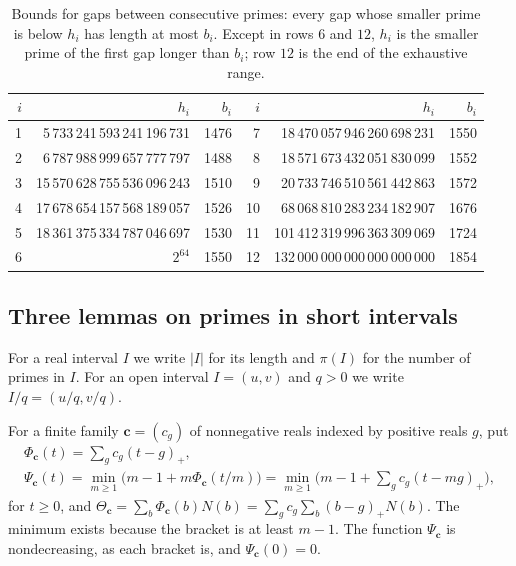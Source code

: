 \documentclass[11pt,colorlinks]{charlie}
\begin{document}
\begin{table}[ht]
\centering\small
\begin{tabular}{@{}rrr@{\qquad}rrr@{}}
\toprule
$i$ & $h_i$ & $b_i$ & $i$ & $h_i$ & $b_i$\\
\midrule
1 & 5\,733\,241\,593\,241\,196\,731 & 1476 & 7 & 18\,470\,057\,946\,260\,698\,231 & 1550\\
2 & 6\,787\,988\,999\,657\,777\,797 & 1488 & 8 & 18\,571\,673\,432\,051\,830\,099 & 1552\\
3 & 15\,570\,628\,755\,536\,096\,243 & 1510 & 9 & 20\,733\,746\,510\,561\,442\,863 & 1572\\
4 & 17\,678\,654\,157\,568\,189\,057 & 1526 & 10 & 68\,068\,810\,283\,234\,182\,907 & 1676\\
5 & 18\,361\,375\,334\,787\,046\,697 & 1530 & 11 & 101\,412\,319\,996\,363\,309\,069 & 1724\\
6 & $2^{64}$ & 1550 & 12 & 132\,000\,000\,000\,000\,000\,000 & 1854\\
\bottomrule
\end{tabular}
\caption{Bounds for gaps between consecutive primes: every gap whose smaller prime is below $h_i$ has length at most $b_i$. Except in rows $6$ and $12$, $h_i$ is the smaller prime of the first gap longer than $b_i$; row $12$ is the end of the exhaustive range.}\label{tab:records}
\end{table}

\subsection{Three lemmas on primes in short intervals}
For a real interval $I$ we write $|I|$ for its length and $\pi(I)$ for the number of primes in $I$. For an open interval $I=(u,v)$ and $q>0$ we write $I/q=(u/q,v/q)$.

For a finite family $\mathbf c=(c_g)$ of nonnegative reals indexed by positive reals $g$, put
\begin{gather*}
 \Phi_{\mathbf c}(t)=\sum_gc_g(t-g)_+,\\
 \Psi_{\mathbf c}(t)=\min_{m\ge1}\big(m-1+m\Phi_{\mathbf c}(t/m)\big)=\min_{m\ge1}\Big(m-1+\sum_gc_g(t-mg)_+\Big),
\end{gather*}
for $t\ge0$, and $\Theta_{\mathbf c}=\sum_b\Phi_{\mathbf c}(b)N(b)=\sum_gc_g\sum_b(b-g)_+N(b)$. The minimum exists because the bracket is at least $m-1$. The function $\Psi_{\mathbf c}$ is nondecreasing, as each bracket is, and $\Psi_{\mathbf c}(0)=0$.
\end{document}
